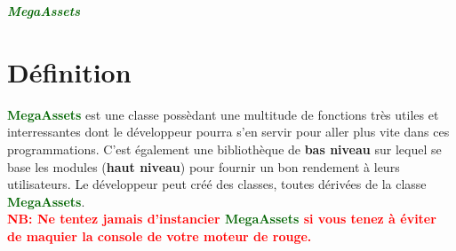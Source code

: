 \documentclass[a4paper, 11pt]{article}
\begin{document}
	\pagecolor{silver}
	\huge{\hspace{14.5cm}\textit{\textbf{\textcolor{darkgreen}{MegaAssets}}}}\large{} \tableofcontents 
	\newpage
	\section{Définition}
	\textcolor{darkgreen}{\textbf{MegaAssets}} est une classe possèdant une multitude de fonctions très 
	utiles et interressantes dont le développeur pourra s'en servir pour aller plus vite dans ces 
	programmations. C'est également une bibliothèque de \textbf{bas niveau} sur lequel se base les modules 
	(\textbf{haut niveau}) pour fournir un bon rendement à leurs utilisateurs. Le développeur peut créé des 
	classes, toutes dérivées de la classe \textcolor{darkgreen}{\textbf{MegaAssets}}.\\
	\textcolor{red}{\textbf{NB: Ne tentez jamais d'instancier \textcolor{darkgreen}{\textbf{MegaAssets}} si 
	vous tenez à éviter de maquier la console de votre moteur de rouge.}}

\end{document}
